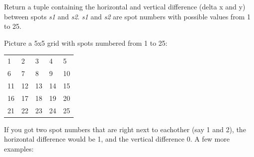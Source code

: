 \documentclass[letterpaper,10pt,english]{sphinxmanual}
\begin{document}

\begin{fulllineitems}
\label{setlyze/std:setlyze.std.get_spot_position_difference}
Return a tuple  containing the horizontal and vertical
difference (delta x and y) between spots \emph{s1} and \emph{s2}. \emph{s1} and
\emph{s2} are spot numbers with possible values from 1 to 25.

Picture a 5x5 grid with spots numbered from 1 to 25:

\begin{tabulary}{\linewidth}{|L|L|L|L|L|}
\hline

1
 & 
2
 & 
3
 & 
4
 & 
5
\\

6
 & 
7
 & 
8
 & 
9
 & 
10
\\

11
 & 
12
 & 
13
 & 
14
 & 
15
\\

16
 & 
17
 & 
18
 & 
19
 & 
20
\\

21
 & 
22
 & 
23
 & 
24
 & 
25
\\
\hline
\end{tabulary}


If you got two spot numbers that are right next to eachother (say 1
and 2), the horizontal difference would be 1, and the vertical
difference 0. A few more examples:


\end{fulllineitems}
\end{document}
